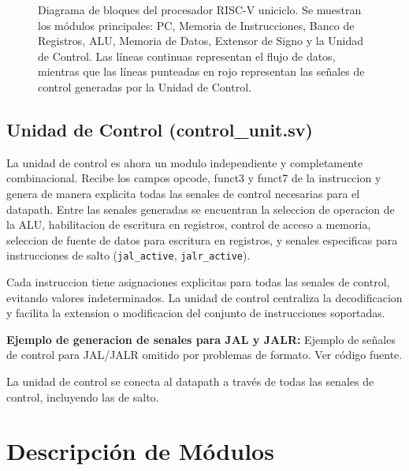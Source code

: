 \documentclass[conference]{IEEEtran}
\begin{document}
\begin{figure}[!t]
    \caption{Diagrama de bloques del procesador RISC-V uniciclo. Se muestran los módulos principales: PC, Memoria de Instrucciones, Banco de Registros, ALU, Memoria de Datos, Extensor de Signo y la Unidad de Control. Las líneas continuas representan el flujo de datos, mientras que las líneas punteadas en rojo representan las señales de control generadas por la Unidad de Control.}
    \label{fig:diagrama_bloques}
\end{figure}

\subsection{Unidad de Control (control\_unit.sv)}
La unidad de control es ahora un modulo independiente y completamente combinacional. Recibe los campos opcode, funct3 y funct7 de la instruccion y genera de manera explicita todas las senales de control necesarias para el datapath. Entre las senales generadas se encuentran la seleccion de operacion de la ALU, habilitacion de escritura en registros, control de acceso a memoria, seleccion de fuente de datos para escritura en registros, y senales especificas para instrucciones de salto (\texttt{jal\_active}, \texttt{jalr\_active}).

Cada instruccion tiene asignaciones explicitas para todas las senales de control, evitando valores indeterminados. La unidad de control centraliza la decodificacion y facilita la extension o modificacion del conjunto de instrucciones soportadas.

\textbf{Ejemplo de generacion de senales para JAL y JALR:}
Ejemplo de señales de control para JAL/JALR omitido por problemas de formato. Ver código fuente.

La unidad de control se conecta al datapath a través de todas las senales de control, incluyendo las de salto.

\section{Descripción de Módulos}
\label{sec:module_descriptions}
\end{document}
